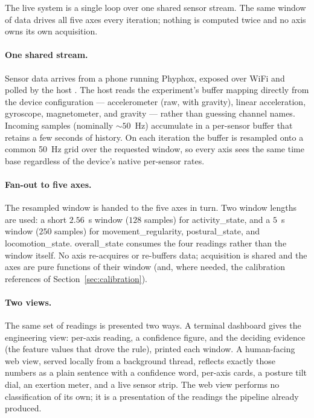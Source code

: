 \documentclass[11pt]{article}
\newcommand{\axis}[1]{\textsf{#1}}          %
\begin{document}
The live system is a single loop over one shared sensor stream. The same window of
data drives all five axes every iteration; nothing is computed twice and no axis owns
its own acquisition.

\paragraph{One shared stream.}
Sensor data arrives from a phone running Phyphox, exposed over WiFi and polled by the
host \citep{staacks2018phyphox}. The host reads the experiment's buffer mapping
directly from the device configuration --- accelerometer (raw, with gravity), linear
acceleration, gyroscope, magnetometer, and gravity --- rather than guessing channel
names. Incoming samples (nominally $\sim 50$~Hz) accumulate in a per-sensor buffer that
retains a few seconds of history. On each iteration the buffer is resampled onto a
common 50~Hz grid over the requested window, so every axis sees the same time base
regardless of the device's native per-sensor rates.

\paragraph{Fan-out to five axes.}
The resampled window is handed to the five axes in turn. Two window lengths are used:
a short $2.56$~s window ($128$ samples) for \axis{activity\_state}, and a $5$~s window
($250$ samples) for \axis{movement\_regularity}, \axis{postural\_state}, and
\axis{locomotion\_state}. \axis{overall\_state} consumes the four readings rather than
the window itself. No axis re-acquires or re-buffers data; acquisition is shared and
the axes are pure functions of their window (and, where needed, the calibration
references of Section~\ref{sec:calibration}).

\paragraph{Two views.}
The same set of readings is presented two ways. A terminal dashboard gives the
engineering view: per-axis reading, a confidence figure, and the deciding evidence
(the feature values that drove the rule), printed each window. A human-facing web view,
served locally from a background thread, reflects exactly those numbers as a plain
sentence with a confidence word, per-axis cards, a posture tilt dial, an exertion
meter, and a live sensor strip. The web view performs no classification of its own; it
is a presentation of the readings the pipeline already produced.
\end{document}

